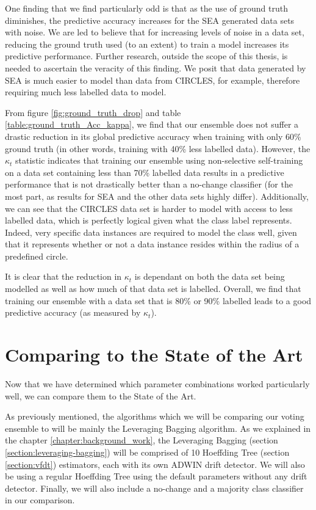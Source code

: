 One finding that we find particularly odd is that as the use of ground truth diminishes, the predictive accuracy increases for the SEA generated data sets with noise. We are led to believe that for increasing levels of noise in a data set, reducing the ground truth used (to an extent) to train a model increases its predictive performance. Further research, outside the scope of this thesis, is needed to ascertain the veracity of this finding. We posit that data generated by SEA is much easier to model than data from CIRCLES, for example, therefore requiring much less labelled data to model.

From figure \ref{fig:ground_truth_drop} and table \ref{table:ground_truth_Acc_kappa}, we find that our ensemble does not suffer a drastic reduction in its global predictive accuracy when training with only 60\% ground truth (in other words, training with 40\% less labelled data). However, the $\kappa_t$ statistic indicates that training our ensemble using non-selective self-training on a data set containing less than 70\% labelled data results in a predictive performance that is not drastically better than a no-change classifier (for the most part, as results for SEA and the other data sets highly differ). Additionally, we can see that the CIRCLES data set is harder to model with access to less labelled data, which is perfectly logical given what the class label represents. Indeed, very specific data instances are required to model the class well, given that it represents whether or not a data instance resides within the radius of a predefined circle.

It is clear that the reduction in $\kappa_t$ is dependant on both the data set being modelled as well as how much of that data set is labelled. Overall, we find that training our ensemble with a data set that is 80\% or 90\% labelled leads to a good predictive accuracy (as measured by $\kappa_t$).

\section{Comparing to the State of the Art}

Now that we have determined which parameter combinations worked particularly well, we can compare them to the State of the Art.

As previously mentioned, the algorithms which we will be comparing our voting ensemble to will be mainly the Leveraging Bagging algorithm. As we explained in the chapter \ref{chapter:background_work}, the Leveraging Bagging (section \ref{section:leveraging-bagging}) will be comprised of 10 Hoeffding Tree (section \ref{section:vfdt}) estimators, each with its own ADWIN drift detector. We will also be using a regular Hoeffding Tree using the default parameters without any drift detector. Finally, we will also include a no-change and a majority class classifier in our comparison.

